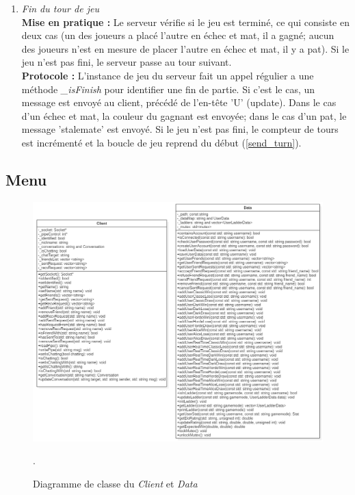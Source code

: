\documentclass[10pt, a4paper]{article}
\begin{document}
\begin{enumerate}
\item \textit{Fin du tour de jeu} \\
\textbf{Mise en pratique :} Le serveur vérifie si le jeu est terminé, ce qui consiste en deux cas (un des joueurs a placé l'autre en échec et mat, il a gagné; aucun des joueurs n'est en mesure de placer l'autre en échec et mat, il y a pat). Si le jeu n'est pas fini, le serveur passe au tour suivant.\\
\textbf{Protocole :} L'instance de jeu du serveur fait un appel régulier a une méthode \textit{\_isFinish} pour identifier une fin de partie. Si c'est le cas, un message est envoyé au client, précédé de l'en-tête 'U' (update). Dans le cas d'un échec et mat, la couleur du gagnant est envoyée; dans le cas d'un pat, le message 'stalemate' est envoyé. Si le jeu n'est pas fini, le compteur de tours est incrémenté et la boucle de jeu reprend du début (\ref{send_turn}).

\end{enumerate}

\subsection{Menu}

\begin{figure}[H]
\centering
\includegraphics[scale=0.72]{client_data.png}
\caption{Diagramme de classe du \textit{Client} et \textit{Data}}.
\end{figure}
\end{document}
